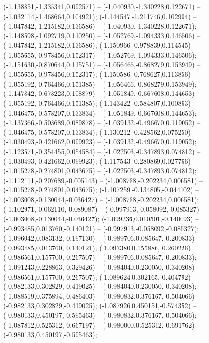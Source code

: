  (-1.138851,-1.335341,0.092571) -- (-1.040930,-1.340228,0.122671) -- (-1.032114,-1.468664,0.104921);
 (-1.144547,-1.211746,0.102904) -- (-1.047842,-1.215182,0.136586) -- (-1.040930,-1.340228,0.122671);
 (-1.148598,-1.092719,0.110250) -- (-1.052769,-1.094333,0.146506) -- (-1.047842,-1.215182,0.136586);
 (-1.150966,-0.978839,0.114545) -- (-1.055655,-0.978456,0.152317) -- (-1.052769,-1.094333,0.146506);
 (-1.151630,-0.870644,0.115751) -- (-1.056466,-0.868279,0.153949) -- (-1.055655,-0.978456,0.152317);
 (-1.150586,-0.768627,0.113856) -- (-1.055192,-0.764466,0.151385) -- (-1.056466,-0.868279,0.153949);
 (-1.147842,-0.673223,0.108879) -- (-1.051849,-0.667608,0.144653) -- (-1.055192,-0.764466,0.151385);
 (-1.143422,-0.584807,0.100863) -- (-1.046475,-0.578207,0.133834) -- (-1.051849,-0.667608,0.144653);
 (-1.137366,-0.503689,0.089878) -- (-1.039132,-0.496670,0.119052) -- (-1.046475,-0.578207,0.133834);
 (-1.130212,-0.428562,0.075250) -- (-1.030493,-0.421662,0.099923) -- (-1.039132,-0.496670,0.119052);
 (-1.123571,-0.354455,0.054584) -- (-1.022503,-0.347893,0.074812) -- (-1.030493,-0.421662,0.099923);
 (-1.117543,-0.280869,0.027766) -- (-1.015278,-0.274801,0.043675) -- (-1.022503,-0.347893,0.074812);
 (-1.112111,-0.207689,-0.005143) -- (-1.008788,-0.202234,0.006581) -- (-1.015278,-0.274801,0.043675);
 (-1.107259,-0.134805,-0.044102) -- (-1.003008,-0.130044,-0.036427) -- (-1.008788,-0.202234,0.006581);
 (-1.102971,-0.062110,-0.089087) -- (-0.997913,-0.058092,-0.085327) -- (-1.003008,-0.130044,-0.036427);
 (-1.099236,0.010501,-0.140093) -- (-0.993485,0.013760,-0.140121) -- (-0.997913,-0.058092,-0.085327);
 (-1.096042,0.083132,-0.197130) -- (-0.989706,0.085647,-0.200833) -- (-0.993485,0.013760,-0.140121);
 (-1.093380,0.155886,-0.260226) -- (-0.986561,0.157700,-0.267507) -- (-0.989706,0.085647,-0.200833);
 (-1.091243,0.228863,-0.329426) -- (-0.984040,0.230050,-0.340208) -- (-0.986561,0.157700,-0.267507);
 (-1.089624,0.302165,-0.404792) -- (-0.982133,0.302829,-0.419025) -- (-0.984040,0.230050,-0.340208);
 (-1.088519,0.375894,-0.486403) -- (-0.980832,0.376167,-0.504066) -- (-0.982133,0.302829,-0.419025);
 (-1.087926,0.450151,-0.574352) -- (-0.980133,0.450197,-0.595463) -- (-0.980832,0.376167,-0.504066);
 (-1.087812,0.525312,-0.667197) -- (-0.980000,0.525312,-0.691762) -- (-0.980133,0.450197,-0.595463);
